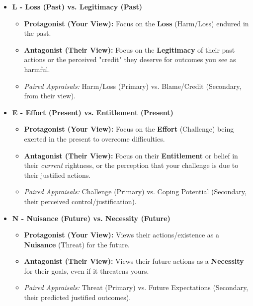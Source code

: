 \documentclass{article}
\begin{document}
\begin{itemize}[noitemsep,topsep=0pt]
    \item \textbf{L - Loss (Past) vs. Legitimacy (Past)}
    \begin{itemize}[noitemsep,topsep=0pt]
        \item \textbf{Protagonist (Your View):} Focus on the \textbf{Loss} (Harm/Loss) endured in the past.
        \item \textbf{Antagonist (Their View):} Focus on the \textbf{Legitimacy} of their past actions or the perceived "credit" they deserve for outcomes you see as harmful.
        \item \textit{Paired Appraisals:} Harm/Loss (Primary) vs. Blame/Credit (Secondary, from their view).
    \end{itemize}

    \item \textbf{E - Effort (Present) vs. Entitlement (Present)}
    \begin{itemize}[noitemsep,topsep=0pt]
        \item \textbf{Protagonist (Your View):} Focus on the \textbf{Effort} (Challenge) being exerted in the present to overcome difficulties.
        \item \textbf{Antagonist (Their View):} Focus on their \textbf{Entitlement} or belief in their \textit{current} rightness, or the perception that your challenge is due to their justified actions.
        \item \textit{Paired Appraisals:} Challenge (Primary) vs. Coping Potential (Secondary, their perceived control/justification).
    \end{itemize}

    \item \textbf{N - Nuisance (Future) vs. Necessity (Future)}
    \begin{itemize}[noitemsep,topsep=0pt]
        \item \textbf{Protagonist (Your View):} Views their actions/existence as a \textbf{Nuisance} (Threat) for the future.
        \item \textbf{Antagonist (Their View):} Views their future actions as a \textbf{Necessity} for their goals, even if it threatens yours.
        \item \textit{Paired Appraisals:} Threat (Primary) vs. Future Expectations (Secondary, their predicted justified outcomes).
    \end{itemize}


\end{itemize}
\end{document}
